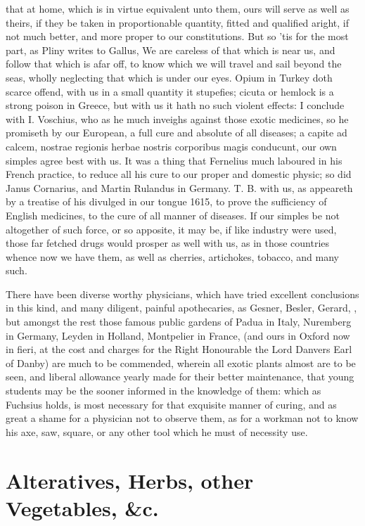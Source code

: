 {that at home, which is in virtue equivalent unto them, ours will serve
as well as theirs, if they be taken in proportionable quantity, fitted
and qualified aright, if not much better, and more proper to our
constitutions. But so 'tis for the most part, as Pliny writes to
Gallus, We are careless of that which is near us, and follow that
which is afar off, to know which we will travel and sail beyond the
seas, wholly neglecting that which is under our eyes. Opium in Turkey
doth scarce offend, with us in a small quantity it stupefies; cicuta or
hemlock is a strong poison in Greece, but with us it hath no such
violent effects: I conclude with I. Voschius, who as he much inveighs
against those exotic medicines, so he promiseth by our European, a full
cure and absolute of all diseases; a capite ad calcem, nostrae regionis
herbae nostris corporibus magis conducunt, our own simples agree best
with us. It was a thing that Fernelius much laboured in his French
practice, to reduce all his cure to our proper and domestic physic; so
did Janus Cornarius, and Martin Rulandus in Germany. T. B. with
us, as appeareth by a treatise of his divulged in our tongue 1615, to
prove the sufficiency of English medicines, to the cure of all manner
of diseases. If our simples be not altogether of such force, or so
apposite, it may be, if like industry were used, those far fetched
drugs would prosper as well with us, as in those countries whence now
we have them, as well as cherries, artichokes, tobacco, and many such.

There have been diverse worthy physicians, which have tried excellent
conclusions in this kind, and many diligent, painful apothecaries, as
Gesner, Besler, Gerard, \etc{}, but amongst the rest those famous public
gardens of Padua in Italy, Nuremberg in Germany, Leyden in Holland,
Montpelier in France, (and ours in Oxford now in fieri, at the cost and
charges for the Right Honourable the Lord Danvers Earl of Danby) are
much to be commended, wherein all exotic plants almost are to be seen,
and liberal allowance yearly made for their better maintenance, that
young students may be the sooner informed in the knowledge of them:
which as Fuchsius holds, is most necessary for that exquisite
manner of curing, and as great a shame for a physician not to observe
them, as for a workman not to know his axe, saw, square, or any other
tool which he must of necessity use.

\section{Alteratives, Herbs, other Vegetables, \&c.}

}
